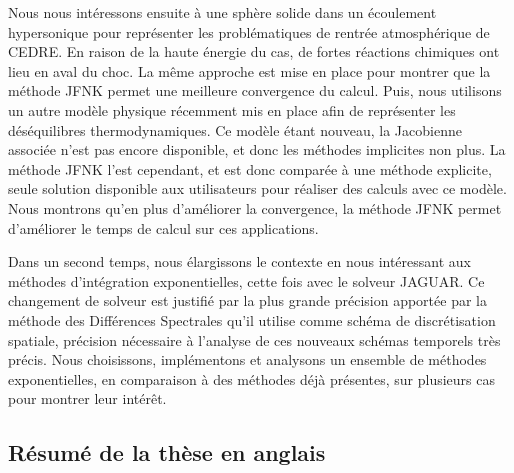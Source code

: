 Nous nous intéressons ensuite à une sphère solide dans un écoulement hypersonique pour représenter les problématiques de rentrée atmosphérique de CEDRE.
En raison de la haute énergie du cas, de fortes réactions chimiques ont lieu en aval du choc.
La même approche est mise en place pour montrer que la méthode JFNK permet une meilleure convergence du calcul.
Puis, nous utilisons un autre modèle physique récemment mis en place afin de représenter les déséquilibres thermodynamiques.
Ce modèle étant nouveau, la Jacobienne associée n'est pas encore disponible, et donc les méthodes implicites non plus.
La méthode JFNK l'est cependant, et est donc comparée à une méthode explicite, seule solution disponible aux utilisateurs pour réaliser des calculs avec ce modèle.
Nous montrons qu'en plus d'améliorer la convergence, la méthode JFNK permet d'améliorer le temps de calcul sur ces applications.

Dans un second temps, nous élargissons le contexte en nous intéressant aux méthodes d'intégration exponentielles, cette fois avec le solveur JAGUAR.
Ce changement de solveur est justifié par la plus grande précision apportée par la méthode des Différences Spectrales qu'il utilise comme schéma de discrétisation spatiale, précision nécessaire à l'analyse de ces nouveaux schémas temporels très précis.
Nous choisissons, implémentons et analysons un ensemble de méthodes exponentielles, en comparaison à des méthodes déjà présentes, sur plusieurs cas pour montrer leur intérêt.


  \subsection{Résumé de la thèse en anglais}


